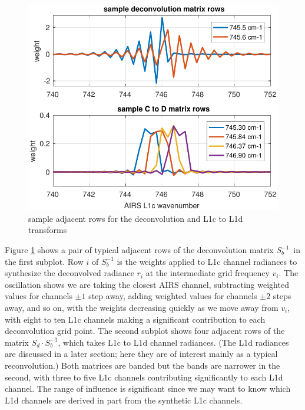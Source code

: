 \documentclass[10pt,twocolumn]{article}  %
\begin{document}


\begin{figure} %
  \centering
  \includegraphics[width=\linewidth]{figures/airs_decon_basis.pdf}
  \caption{sample adjacent rows for the deconvolution and L1c to L1d
    transforms}
  \label{dbasis}
\end{figure}

Figure \ref{dbasis} shows a pair of typical adjacent rows of the
deconvolution matrix $S_b^{-1}$\, in the first subplot.  Row $i$ of
$S_b^{-1}$ is the weights applied to L1c channel radiances to
synthesize the deconvolved radiance $r_i$ at the intermediate grid
frequency $v_i$.  The oscillation shows we are taking the closest
AIRS channel, subtracting weighted values for channels $\pm 1$ step
away, adding weighted values for channels $\pm 2$ steps away, and so
on, with the weights decreasing quickly as we move away from $v_i$,
with eight to ten L1c channels making a significant contribution to
each deconvolution grid point.  The second subplot shows four
adjacent rows of the matrix $S_d \cdot S_b^{-1}$, which takes L1c to
L1d channel radiances.  (The L1d radiances are discussed in a later
section; here they are of interest mainly as a typical
reconvolution.)  Both matrices are banded but the bands are narrower
in the second, with three to five L1c channels contributing
significantly to each L1d channel.  The range of influence is
significant since we may want to know which L1d channels are derived
in part from the synthetic L1c channels.
\end{document}
